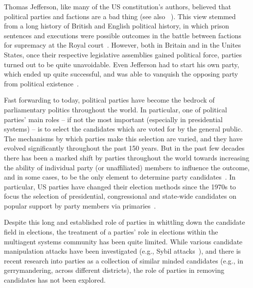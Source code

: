 \documentclass[letterpaper]{article} %
\newcommand{\citet}[1]{\citeauthor{#1}~\shortcite{#1}}
\theoremstyle{definition}
\begin{document}
Thomas Jefferson, like many of the US constitution's authors, believed that political parties and factions are a bad thing (see also \citet{HMJ87}). This view stemmed from a long history of British and English political history, in which prison sentences and executions were possible outcomes in the battle between factions for supremacy at the Royal court~\cite{Sim07}. However, both in Britain and in the Unites States, once their respective legislative assemblies gained political force, parties turned out to be quite unavoidable. Even Jefferson had to start his own party, which ended up quite successful, and was able to vanquish the opposing party from political existence~\cite{Wil05}.

Fast forwarding to today, political parties have become the bedrock of parliamentary politics throughout the world. In particular, one of political parties' main roles -- if not the most important (especially in presidential systems) -- is to select the candidates which are voted for by the general public. The mechanisms by which parties make this selection are varied, and they have evolved significantly throughout the past 150 years. But in the past few decades there has been a marked shift by parties throughout the world towards increasing the ability of individual party (or unaffiliated) members to influence the outcome, and in some cases, to be the only element to determine party candidates~\cite{CB11}. In particular, US parties have changed their election methods since the 1970s to focus the selection of presidential, congressional and state-wide candidates on popular support by party members via primaries~\cite{CKNZ08}.

Despite this long and established role of parties in whittling down the candidate field in elections, the treatment of a parties' role in elections within the multiagent systems community has been quite limited. While various candidate manipulation attacks have been investigated (e.g., Sybil attacks~\cite{CM10}), and there is recent research into parties as a collection of similar minded candidates (e.g., in gerrymandering, across different districts), the role of parties in removing candidates has not been explored.

\end{document}
